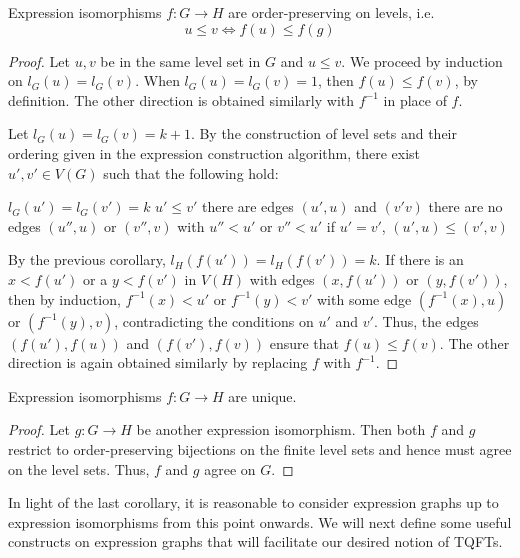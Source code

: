 \begin{lem}
Expression isomorphisms $f : G \to H$ are order-preserving on levels, i.e.
\[
  u \leq v \iff f(u) \leq f(g)
\]
\end{lem}
\begin{proof}
Let $u, v$ be in the same level set in $G$ and $u \leq v$. We proceed by
induction on $l_G(u) = l_G(v)$. When $l_G(u) = l_G(v) = 1$, then
$f(u) \leq f(v)$, by definition. The other direction is obtained similarly with
$f^{-1}$ in place of $f$.

Let $l_G(u) = l_G(v) = k + 1$. By the construction of level sets and their
ordering given in the expression construction algorithm, there exist
$u', v' \in V(G)$ such that the following hold:
\begin{enmrt}
\li $l_G(u') = l_G(v') = k$
\li $u' \leq v'$
\li there are edges $(u', u)$ and $(v' v)$
\li there are no edges $(u'', u)$ or $(v'', v)$ with $u'' < u'$ or $v'' < u'$
\li if $u' = v'$, $(u', u) \leq (v', v)$
\end{enmrt}
By the previous corollary, $l_H(f(u')) = l_H(f(v')) = k$.
If there is an $x < f(u')$ or a $y < f(v')$ in $V(H)$ with edges
$(x, f(u'))$ or $(y, f(v'))$, then by induction, $f^{-1}(x) < u'$ or
$f^{-1}(y) < v'$ with some edge $(f^{-1}(x), u)$ or $(f^{-1}(y), v)$,
contradicting the conditions on $u'$ and $v'$. Thus, the edges $(f(u'), f(u))$
and $(f(v'), f(v))$ ensure that $f(u) \leq f(v)$. The other direction is again
obtained similarly by replacing $f$ with $f^{-1}$.
\end{proof}

\begin{cor}\label{cor:expiso_unique}
Expression isomorphisms $f : G \to H$ are unique.
\end{cor}
\begin{proof}
Let $g : G \to H$ be another expression isomorphism. Then both $f$ and $g$
restrict to order-preserving bijections on the finite level sets and hence must
agree on the level sets. Thus, $f$ and $g$ agree on $G$.
\end{proof}

In light of the last corollary, it is reasonable to consider expression graphs
up to expression isomorphisms from this point onwards. We will next define some
useful constructs on expression graphs that will facilitate our desired notion
of TQFTs.


